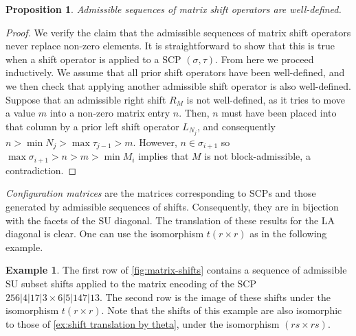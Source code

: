 \documentclass{amsart}
\newcommand{\darkblue}{\color{darkblue}} %
\newtheorem{proposition}[theorem]{Proposition}
\theoremstyle{definition}
\newtheorem{example}[theorem]{Example}
\newcommand{\defn}[1]{\textsl{\darkblue #1}} %
\newcommand{\SU}{\mathrm{SU}}
\newcommand{\LA}{\mathrm{LA}}
\newcommand{\SCP}{\mathrm{SCP}}
\begin{document}
\begin{proposition}
Admissible sequences of matrix shift operators are well-defined.
\end{proposition}

\begin{proof}
We verify the claim that the admissible sequences of matrix shift operators never replace non-zero elements.
It is straightforward to show that this is true when a shift operator is applied to a $\SCP$ $(\sigma,\tau)$.
From here we proceed inductively.
We assume that all prior shift operators have been well-defined, and we then check that applying another admissible shift operator is also well-defined.
Suppose that an admissible right shift $R_{M}$ is not well-defined, as it tries to move a value $m$ into a non-zero matrix entry $n$.
Then, $n$ must have been placed into that column by a prior left shift operator $L_{N_j}$, and consequently $n>\min N_j > \max \tau_{j-1}> m$.
However, $n\in \sigma_{i+1}$ so $\max \sigma_{i+1}>n>m>\min M_i $ implies that $M$ is not block-admissible, a contradiction.
\end{proof}

\defn{Configuration matrices} \cite[Def. 7]{SaneblidzeUmble} are the matrices corresponding to $\SCP$s and those generated by admissible sequences of shifts.
Consequently, they are in bijection with the facets of the $\SU$ diagonal.
The translation of these results for the $\LA$ diagonal is clear.
One can use the isomorphism $t(r\times r)$ as in the following example. 

\begin{example}
\label{ex:matrix shifts}
The first row of \cref{fig:matrix-shifts} contains a sequence of admissible $\SU$ subset shifts applied to the matrix encoding of the SCP $256|4|17|3\times 6|5|147|13$. 
The second row is the image of these shifts under the isomorphism $t(r\times r)$.
Note that the shifts of this example are also isomorphic to those of \cref{ex:shift translation by theta}, under the isomorphism $(rs\times rs)$.
\end{example}
\end{document}
